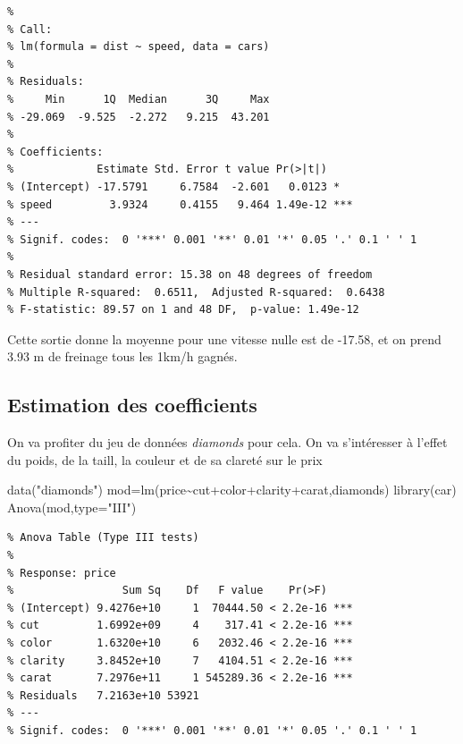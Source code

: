 \documentclass[
]{article}
\newenvironment{Shaded}{\begin{snugshade}}{\end{snugshade}}
\newcommand{\AttributeTok}[1]{\textcolor[rgb]{0.77,0.63,0.00}{#1}}
\newcommand{\FunctionTok}[1]{\textcolor[rgb]{0.00,0.00,0.00}{#1}}
\newcommand{\NormalTok}[1]{#1}
\newcommand{\OtherTok}[1]{\textcolor[rgb]{0.56,0.35,0.01}{#1}}
\newcommand{\SpecialCharTok}[1]{\textcolor[rgb]{0.00,0.00,0.00}{#1}}
\newcommand{\StringTok}[1]{\textcolor[rgb]{0.31,0.60,0.02}{#1}}
\begin{document}
\begin{verbatim}
% 
% Call:
% lm(formula = dist ~ speed, data = cars)
% 
% Residuals:
%     Min      1Q  Median      3Q     Max 
% -29.069  -9.525  -2.272   9.215  43.201 
% 
% Coefficients:
%             Estimate Std. Error t value Pr(>|t|)    
% (Intercept) -17.5791     6.7584  -2.601   0.0123 *  
% speed         3.9324     0.4155   9.464 1.49e-12 ***
% ---
% Signif. codes:  0 '***' 0.001 '**' 0.01 '*' 0.05 '.' 0.1 ' ' 1
% 
% Residual standard error: 15.38 on 48 degrees of freedom
% Multiple R-squared:  0.6511,  Adjusted R-squared:  0.6438 
% F-statistic: 89.57 on 1 and 48 DF,  p-value: 1.49e-12
\end{verbatim}

Cette sortie donne la moyenne pour une vitesse nulle est de -17.58, et
on prend 3.93 m de freinage tous les 1km/h gagnés.

\hypertarget{estimation-des-coefficients}{%
\subsection{Estimation des
coefficients}\label{estimation-des-coefficients}}

On va profiter du jeu de données \emph{diamonds} pour cela. On va
s'intéresser à l'effet du poids, de la taill, la couleur et de sa
clareté sur le prix

\begin{Shaded}
\begin{Highlighting}[]
\FunctionTok{data}\NormalTok{(}\StringTok{"diamonds"}\NormalTok{)}
\NormalTok{mod}\OtherTok{=}\FunctionTok{lm}\NormalTok{(price}\SpecialCharTok{\textasciitilde{}}\NormalTok{cut}\SpecialCharTok{+}\NormalTok{color}\SpecialCharTok{+}\NormalTok{clarity}\SpecialCharTok{+}\NormalTok{carat,diamonds)}
\FunctionTok{library}\NormalTok{(car)}
\FunctionTok{Anova}\NormalTok{(mod,}\AttributeTok{type=}\StringTok{"III"}\NormalTok{)}
\end{Highlighting}
\end{Shaded}

\begin{verbatim}
% Anova Table (Type III tests)
% 
% Response: price
%                 Sum Sq    Df   F value    Pr(>F)    
% (Intercept) 9.4276e+10     1  70444.50 < 2.2e-16 ***
% cut         1.6992e+09     4    317.41 < 2.2e-16 ***
% color       1.6320e+10     6   2032.46 < 2.2e-16 ***
% clarity     3.8452e+10     7   4104.51 < 2.2e-16 ***
% carat       7.2976e+11     1 545289.36 < 2.2e-16 ***
% Residuals   7.2163e+10 53921                        
% ---
% Signif. codes:  0 '***' 0.001 '**' 0.01 '*' 0.05 '.' 0.1 ' ' 1
\end{verbatim}
\end{document}
